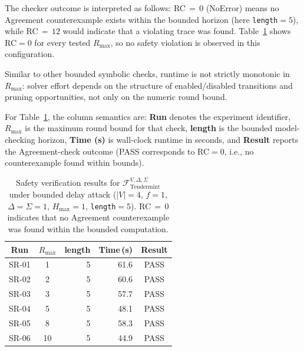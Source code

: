 The checker outcome is interpreted as follows:
RC$\,=\,0$ (NoError) means no Agreement counterexample exists within the
bounded horizon (here \texttt{length}$=5$), while RC$\,=\,12$ would indicate
that a violating trace was found.
Table~\ref{tab:safety} shows RC$=0$ for every tested $R_{\max}$,
so no safety violation is observed in this configuration.

Similar to other bounded symbolic checks, runtime is not strictly monotonic
in $R_{\max}$: solver effort depends on the structure of enabled/disabled
transitions and pruning opportunities, not only on the numeric round bound.

For Table~\ref{tab:safety}, the column semantics are:
\textbf{Run} denotes the experiment identifier,
$R_{\max}$ is the maximum round bound for that check,
\textbf{length} is the bounded model-checking horizon,
\textbf{Time (s)} is wall-clock runtime in seconds,
and \textbf{Result} reports the Agreement-check outcome
(PASS corresponds to RC$=0$, i.e., no counterexample found within bounds).

\begin{table}[ht]
\centering
\caption{%
  Safety verification results for
  $\mathcal{F}^{V,\Delta,\Sigma}_{\mathrm{Tendermint}}$
  under bounded delay attack
  ($|V|=4$, $f=1$, $\Delta=\Sigma=1$, $H_{\max}=1$,
  \texttt{length}$=5$).
  RC$\,=\,0$ indicates that no Agreement counterexample was found
  within the bounded computation.
}
\label{tab:safety}
\small
\begin{tabular}{@{}ccrrc@{}}
\toprule
\textbf{Run} &
$R_{\max}$ &
\textbf{length} &
\textbf{Time\,(s)} &
\textbf{Result} \\
\midrule
SR-01 &  1 & 5 & 61.6 & PASS \\
SR-02 &  2 & 5 & 60.6 & PASS \\
SR-03 &  3 & 5 & 57.7 & PASS \\
SR-04 &  5 & 5 & 48.1 & PASS \\
SR-05 &  8 & 5 & 58.3 & PASS \\
SR-06 & 10 & 5 & 44.9 & PASS \\
\bottomrule
\end{tabular}
\end{table}
